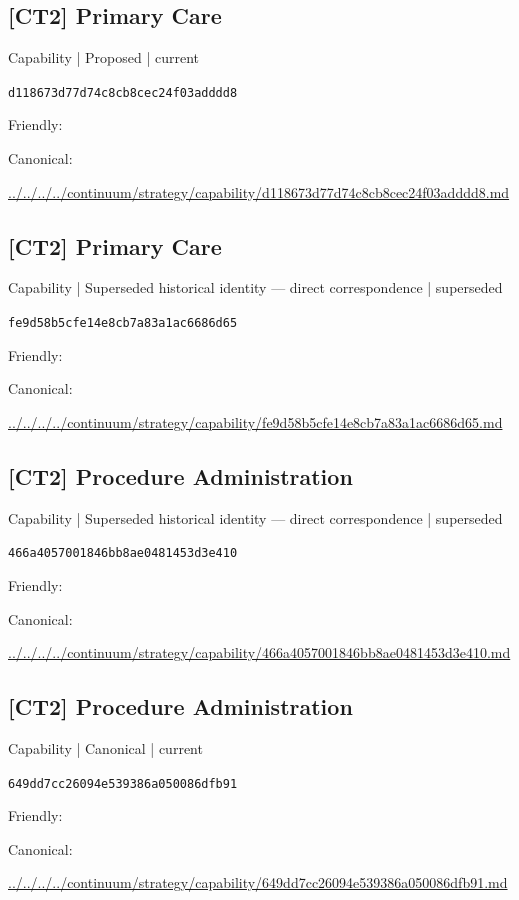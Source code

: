 \documentclass[10pt,a4paper]{article}
\begin{document}
\subsection*{[CT2] Primary Care}
{\small Capability | Proposed | current}\par
\texttt{d118673d77d74c8cb8cec24f03adddd8}\par
Friendly: \par
Canonical: \par
{\footnotesize\url{../../../../continuum/strategy/capability/d118673d77d74c8cb8cec24f03adddd8.md}}\par
\subsection*{[CT2] Primary Care}
{\small Capability | Superseded historical identity — direct correspondence | superseded}\par
\texttt{fe9d58b5cfe14e8cb7a83a1ac6686d65}\par
Friendly: \par
Canonical: \par
{\footnotesize\url{../../../../continuum/strategy/capability/fe9d58b5cfe14e8cb7a83a1ac6686d65.md}}\par
\subsection*{[CT2] Procedure Administration}
{\small Capability | Superseded historical identity — direct correspondence | superseded}\par
\texttt{466a4057001846bb8ae0481453d3e410}\par
Friendly: \par
Canonical: \par
{\footnotesize\url{../../../../continuum/strategy/capability/466a4057001846bb8ae0481453d3e410.md}}\par
\subsection*{[CT2] Procedure Administration}
{\small Capability | Canonical | current}\par
\texttt{649dd7cc26094e539386a050086dfb91}\par
Friendly: \par
Canonical: \par
{\footnotesize\url{../../../../continuum/strategy/capability/649dd7cc26094e539386a050086dfb91.md}}\par
\end{document}
